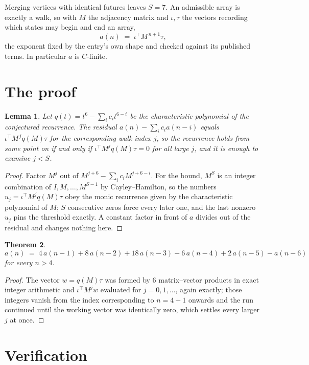 \documentclass[11pt,a4paper]{article}
\theoremstyle{plain}
\newtheorem{theorem}{Theorem}
\newtheorem{lemma}[theorem]{Lemma}
\theoremstyle{definition}
\begin{document}
Merging vertices with identical futures leaves $S=7$. An admissible array is exactly a walk, so with $M$ the adjacency matrix and $\iota,\tau$ the vectors recording which states may begin and end an array,
\[
a(n)\;=\;\iota^{\!\top}M^{\,n+1}\tau ,
\]
the exponent fixed by the entry's own shape and checked against its published terms. In
particular $a$ is $C$-finite.

\section{The proof}

\begin{lemma}\label{lem:crit}
Let $q(t)=t^{6}-\sum_i c_it^{6-i}$ be the characteristic polynomial of the
conjectured recurrence. The residual $a(n)-\sum_ic_ia(n-i)$ equals
$\iota^{\!\top}M^{\,j}q(M)\tau$ for the corresponding walk index $j$, so the recurrence
holds from some point on if and only if $\iota^{\!\top}M^{j}q(M)\tau=0$ for all large $j$,
and it is enough to examine $j<S$.
\end{lemma}

\begin{proof}
Factor $M^{j}$ out of $M^{j+6}-\sum_ic_iM^{j+6-i}$. For the bound, $M^{S}$
is an integer combination of $I,M,\dots,M^{S-1}$ by Cayley--Hamilton, so the numbers
$u_j=\iota^{\!\top}M^{j}q(M)\tau$ obey the monic recurrence given by the characteristic
polynomial of $M$; $S$ consecutive zeros force every later one, and the last nonzero $u_j$
pins the threshold exactly. A constant factor in front of $a$ divides out of the residual and
changes nothing here.
\end{proof}

\begin{theorem}
\[
a(n)\;=\;4\,a(n-1) + 8\,a(n-2) + 18\,a(n-3) - 6\,a(n-4) + 2\,a(n-5) - a(n-6)
\]
for every $n>4$.
\end{theorem}

\begin{proof}
The vector $w=q(M)\tau$ was formed by $6$ matrix--vector products in exact integer
arithmetic and $\iota^{\!\top}M^{j}w$ evaluated for $j=0,1,\dots$, again exactly; those
integers vanish from the index corresponding to $n=4+1$ onwards and the run continued
until the working vector was identically zero, which settles every larger $j$ at once.
\end{proof}

\section{Verification}
\end{document}
